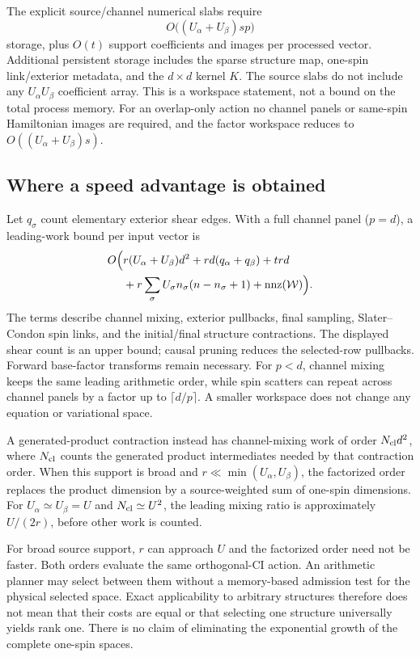 \documentclass[11pt,a4paper]{article}
\newcommand{\Wa}{\mathcal W}
\begin{document}
The explicit source/channel numerical slabs require
\begin{equation}\label{eq:memory}
 O\bigl((U_\alpha+U_\beta)sp\bigr)
\end{equation}
storage, plus $O(t)$ support coefficients and images per processed vector.
Additional persistent storage includes the sparse structure map, one-spin
link/exterior metadata, and the $d\times d$ kernel $K$. The source slabs
do not include any $U_\alpha U_\beta$ coefficient array. This is a
workspace statement, not a bound on the total process memory.
For an overlap-only action no channel panels or same-spin Hamiltonian
images are required, and the factor workspace reduces to
$O((U_\alpha+U_\beta)s)$.

\subsection{Where a speed advantage is obtained}

Let $q_\sigma$ count elementary exterior shear edges. With a full channel
panel ($p=d$), a leading-work bound per input vector is
\begin{align}\label{eq:work}
 O\Bigl(&r(U_\alpha+U_\beta)d^2
       +rd(q_\alpha+q_\beta)+trd\notag\\
       &+r\sum_\sigma U_\sigma n_\sigma(n-n_\sigma+1)
       +\operatorname{nnz}(\Wa)\Bigr).
\end{align}
The terms describe channel mixing, exterior pullbacks, final sampling,
Slater--Condon spin links, and the initial/final structure contractions.
The displayed shear count is an upper bound; causal pruning reduces the
selected-row pullbacks. Forward base-factor transforms remain necessary.
For $p<d$, channel mixing keeps the same leading arithmetic order, while
spin scatters can repeat across channel panels by a factor up to
$\lceil d/p\rceil$. A smaller workspace does not change any equation or
variational space.

A generated-product contraction instead has channel-mixing work of order
$N_{\rm cl}d^2$, where $N_{\rm cl}$ counts the generated product
intermediates needed by that contraction order. When this support is broad
and $r\ll\min(U_\alpha,U_\beta)$, the factorized order replaces the
product dimension by a source-weighted sum of one-spin dimensions. For
$U_\alpha\simeq U_\beta=U$ and $N_{\rm cl}\simeq U^2$, the leading
mixing ratio is approximately $U/(2r)$, before other work is counted.

For broad source support, $r$ can approach $U$ and the factorized order
need not be faster. Both orders evaluate the same orthogonal-CI action.
An arithmetic planner may select between them without a memory-based
admission test for the physical selected space. Exact applicability to
arbitrary structures therefore does not mean that their costs are equal
or that selecting one structure universally yields rank one. There is no
claim of eliminating the exponential growth of the complete one-spin
spaces.
\end{document}
